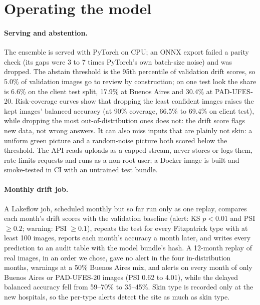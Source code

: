 \documentclass[11pt]{article}
\begin{document}
\section{Operating the model}
\paragraph{Serving and abstention.} The ensemble is served with PyTorch on CPU; an ONNX export
failed a parity check (its gaps were 3 to 7 times PyTorch's own batch-size noise) and was
dropped. The abstain threshold is the 95th percentile of validation drift scores, so 5.0\% of
validation images go to review by construction; on one test look the share is 6.6\% on the
client test split, 17.9\% at Buenos Aires and 30.4\% at PAD-UFES-20. Risk-coverage curves show
that dropping the least confident images raises the kept images' balanced accuracy (at 90\%
coverage, 66.5\% to 69.4\% on client test), while dropping the most out-of-distribution ones
does not: the drift score flags new data, not wrong answers. It can also miss inputs that are
plainly not skin: a uniform green picture and a random-noise picture both scored below the
threshold. The API reads uploads as a capped stream, never stores or logs them, rate-limits
requests and runs as a non-root user; a Docker image is built and smoke-tested in CI with an untrained test bundle.

\paragraph{Monthly drift job.} A Lakeflow job, scheduled monthly but so far run only as one replay, compares each month's drift scores with
the validation baseline (alert: KS $p<0.01$ and PSI $\ge 0.2$; warning: PSI $\ge 0.1$), repeats
the test for every Fitzpatrick type with at least 100 images, reports each month's accuracy a
month later, and writes every prediction to an audit table with the model bundle's hash. A
12-month replay of real images, in an order we chose, gave no alert in the four in-distribution
months, warnings at a 50\% Buenos Aires mix, and alerts on every month of only Buenos Aires or
PAD-UFES-20 images (PSI 0.62 to 4.01), while the delayed balanced accuracy fell from 59--70\%
to 35--45\%. Skin type is recorded only at the new hospitals, so the per-type alerts detect the
site as much as skin type.
\end{document}
